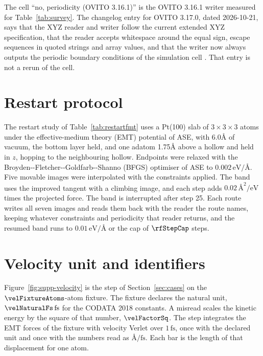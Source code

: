 \documentclass[preprint,12pt]{elsarticle}
\begin{document}
The cell ``no, periodicity (OVITO 3.16.1)'' is the OVITO 3.16.1 writer measured for Table~\ref{tab:survey}.
The changelog entry for OVITO 3.17.0, dated 2026-10-21, says that the XYZ reader and writer follow the current extended XYZ specification, that the reader accepts whitespace around the equal sign, escape sequences in quoted strings and array values, and that the writer now always outputs the periodic boundary conditions of the simulation cell \cite{ovitoChangelog3170}.
That entry is not a rerun of the cell.



\FloatBarrier \section{Restart protocol}\label{sec:supp-restart} The restart study of Table~\ref{tab:restartfmt} uses a Pt(100) slab of \(3\times3\times3\) atoms under the effective-medium theory (EMT) potential of ASE, with 6.0\hspace*{.2em}\AA{} of vacuum, the bottom layer held, and one adatom 1.75\hspace*{.2em}\AA{} above a hollow and held in \(z\), hopping to the neighbouring hollow.
Endpoints were relaxed with the Broyden-{}-Fletcher-{}-Goldfarb-{}-Shanno (BFGS) optimiser of ASE to \(0.002\,\mathrm{eV/\text{\AA}}\).
Five movable images were interpolated with the constraints applied.
The band uses the improved tangent with a climbing image, and each step adds \(0.02\,\text{\AA}^2/\mathrm{eV}\) times the projected force.
The band is interrupted after step 25.
Each route writes all seven images and reads them back with the reader the route names, keeping whatever constraints and periodicity that reader returns, and the resumed band runs to \(0.01\,\mathrm{eV/\text{\AA}}\) or the cap of \(\rfStepCap\) steps.




\FloatBarrier \section{Velocity unit and identifiers}\label{sec:supp-velocity} Figure~\ref{fig:supp-velocity} is the step of Section~\ref{sec:cases} on the \(\velFixtureAtoms\)-atom fixture.
The fixture declares the natural unit, \(\velNaturalFs\,\mathrm{fs}\) for the CODATA 2018 constants.
A misread scales the kinetic energy by the square of that number, \(\velFactorSq\).
The step integrates the EMT forces of the fixture with velocity Verlet over \(1\,\mathrm{fs}\), once with the declared unit and once with the numbers read as \(\text{\AA}/\mathrm{fs}\).
Each bar is the length of that displacement for one atom.
\end{document}
